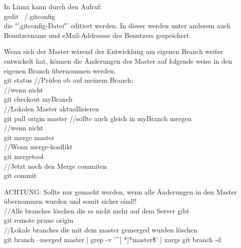 In Linux kann durch den Aufruf:\\
gedit ~/.gitconfig\\
die "'.gitconfig-Datei"' editiert werden. In dieser werden unter anderem auch Benutzername und eMail-Addressse des Benutzers gespeichert.
\nsecend

Wenn sich der Master wärend der Entwicklung am eigenen Branch weiter entwickelt hat, können die Änderungen des Master auf folgende weise in den eigenen Branch übernommen werden.\\
git status //Prüfen ob auf meinem Branch;\\
//wenn nicht\\
git checkout myBranch\\
//Lokalen Master aktuallisieren\\
git pull origin master //sollte auch gleich in myBranch mergen\\
//wenn nicht\\
git merge master\\
//Wenn merge-konflikt\\
git mergetool\\
//Jetzt noch den Merge commiten\\
git commit
\nsecend

ACHTUNG: Sollte nur gemacht werden, wenn alle Änderungen in den Master übernommen wurden und somit sicher sind!!\\
//Alle branches löschen die es nicht mehr auf dem Server gibt\\
git remote prune origin\\
//Lokale branches die mit dem master gemerged wurden löschen\\
git branch --merged master | grep -v '\textasciicircum[ *]*master\$' | xargs git branch -d
\nsecend

\nsecend %
\nsecend %